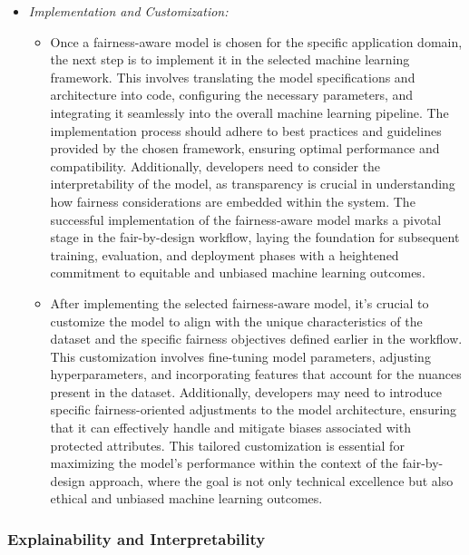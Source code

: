\documentclass[12pt,a4paper,openright,twoside]{book}
\begin{document}
\begin{itemize}
\begin{itemize}
    \end{itemize}
    
    \item \emph{Implementation and Customization:}
    
    \begin{itemize}
    
        \item Once a fairness-aware model is chosen for the specific application domain, the next step is to implement it in the selected machine learning framework. This involves translating the model specifications and architecture into code, configuring the necessary parameters, and integrating it seamlessly into the overall machine learning pipeline. The implementation process should adhere to best practices and guidelines provided by the chosen framework, ensuring optimal performance and compatibility. Additionally, developers need to consider the interpretability of the model, as transparency is crucial in understanding how fairness considerations are embedded within the system. The successful implementation of the fairness-aware model marks a pivotal stage in the fair-by-design workflow, laying the foundation for subsequent training, evaluation, and deployment phases with a heightened commitment to equitable and unbiased machine learning outcomes.
    
        \item After implementing the selected fairness-aware model, it's crucial to customize the model to align with the unique characteristics of the dataset and the specific fairness objectives defined earlier in the workflow. This customization involves fine-tuning model parameters, adjusting hyperparameters, and incorporating features that account for the nuances present in the dataset. Additionally, developers may need to introduce specific fairness-oriented adjustments to the model architecture, ensuring that it can effectively handle and mitigate biases associated with protected attributes. This tailored customization is essential for maximizing the model's performance within the context of the fair-by-design approach, where the goal is not only technical excellence but also ethical and unbiased machine learning outcomes.
    
    \end{itemize}

\end{itemize}

\subsubsection{Explainability and Interpretability}
\end{document}
